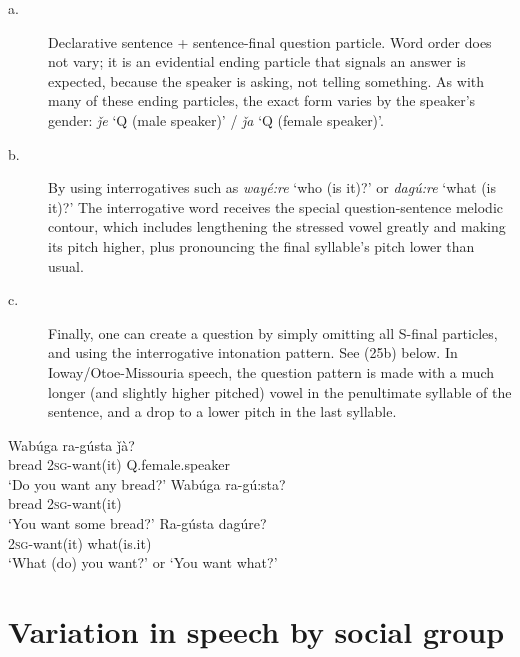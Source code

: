 \documentclass[output=paper]{LSP/langsci}
\begin{document}
\begin{description}
\item[a.] Declarative sentence + sentence-final question particle. Word order does not vary; it is an evidential ending particle that signals an answer is expected, because the speaker is asking, not telling something.  As with many of these ending particles, the exact form varies by the speaker's gender: \textit{\v{j}e} `Q (male speaker)' / \textit{\v{j}a} `Q (female speaker)'. 

\item[b.]  By using interrogatives such as \textit{way\'e:re} `who (is it)?' or \textit{dag\'u:re} `what (is it)?' The interrogative word receives the special question-sentence melodic contour, which includes lengthening the stressed vowel greatly and making its pitch higher, plus pronouncing the final syllable's pitch lower than usual.  	

\item[c.]  Finally, one can create a question by simply omitting all S-final particles, and using the interrogative intonation pattern. See (25b) below.  In Ioway/Otoe-Missouria speech, the question pattern is made with a much longer (and slightly higher pitched) vowel in the penultimate syllable of the sentence, and a drop to a lower pitch in the last syllable.	
\end{description}
\begin{exe}
\ex
\begin{xlist}	       		          	     
\ex \gll Wab\'uga ra-g\'usta       \v{j}\`a?  \\						 	      		
bread       2\textsc{sg}-want(it) Q.female.speaker \\					     		
\trans `Do you want any bread?' 
\ex \gll Wab\'uga ra-g\'u:sta? \\					 	 	         		
bread        2\textsc{sg}-want(it) \\			     	     		
\trans `You want some bread?'	
\ex \gll Ra-g\'usta    dag\'ure?  \\							        		
2\textsc{sg}-want(it) what(is.it) \\				                    		 	
\trans `What (do) you want?' or `You want what?'
\end{xlist}
\end{exe}

\section{Variation in speech by social group}
\end{document}
